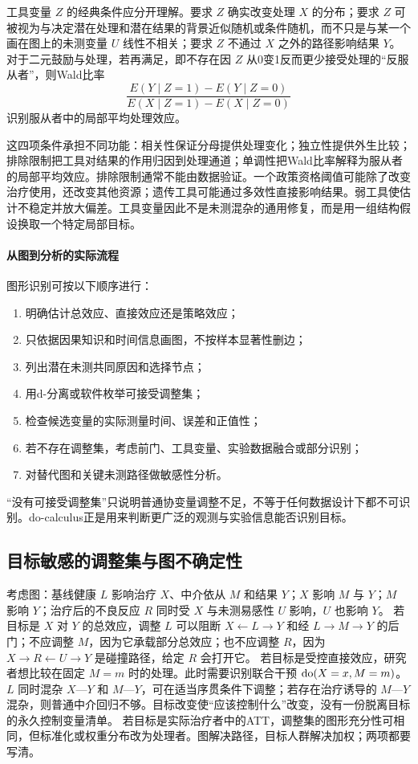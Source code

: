 工具变量 $Z$ 的经典条件应分开理解。要求 $Z$ 确实改变处理 $X$ 的分布；要求 $Z$ 可被视为与决定潜在处理和潜在结果的背景近似随机或条件随机，而不只是与某一个画在图上的未测变量 $U$ 线性不相关；要求 $Z$ 不通过 $X$ 之外的路径影响结果 $Y$。对于二元鼓励与处理，若再满足，即不存在因 $Z$ 从0变1反而更少接受处理的“反服从者”，则Wald比率
\[
\frac{E(Y\mid Z=1)-E(Y\mid Z=0)}
{E(X\mid Z=1)-E(X\mid Z=0)}
\]
识别服从者中的局部平均处理效应\parencite{angrist1996}。

这四项条件承担不同功能：相关性保证分母提供处理变化；独立性提供外生比较；排除限制把工具对结果的作用归因到处理通道；单调性把Wald比率解释为服从者的局部平均效应。排除限制通常不能由数据验证。一个政策资格阈值可能除了改变治疗使用，还改变其他资源；遗传工具可能通过多效性直接影响结果。弱工具使估计不稳定并放大偏差。工具变量因此不是未测混杂的通用修复，而是用一组结构假设换取一个特定局部目标。

\paragraph{从图到分析的实际流程}

图形识别可按以下顺序进行：

\begin{enumerate}
  \item 明确估计总效应、直接效应还是策略效应；
  \item 只依据因果知识和时间信息画图，不按样本显著性删边；
  \item 列出潜在未测共同原因和选择节点；
  \item 用d-分离或软件枚举可接受调整集；
  \item 检查候选变量的实际测量时间、误差和正值性；
  \item 若不存在调整集，考虑前门、工具变量、实验数据融合或部分识别；
  \item 对替代图和关键未测路径做敏感性分析。
\end{enumerate}

“没有可接受调整集”只说明普通协变量调整不足，不等于任何数据设计下都不可识别。do-calculus正是用来判断更广泛的观测与实验信息能否识别目标。

\subsection{目标敏感的调整集与图不确定性}

考虑图：基线健康 $L$ 影响治疗 $X$、中介依从 $M$ 和结果 $Y$；$X$ 影响 $M$ 与 $Y$；$M$ 影响 $Y$；治疗后的不良反应 $R$ 同时受 $X$ 与未测易感性 $U$ 影响，$U$ 也影响 $Y$。
若目标是 $X$ 对 $Y$ 的总效应，调整 $L$ 可以阻断 $X\leftarrow L\rightarrow Y$ 和经 $L\rightarrow M\rightarrow Y$ 的后门；不应调整 $M$，因为它承载部分总效应；也不应调整 $R$，因为 $X\rightarrow R\leftarrow U\rightarrow Y$ 是碰撞路径，给定 $R$ 会打开它。
若目标是受控直接效应，研究者想比较在固定 $M=m$ 时的处理。此时需要识别联合干预 $\operatorname{do}(X=x,M=m)$。$L$ 同时混杂 $X$---$Y$ 和 $M$---$Y$，可在适当序贯条件下调整；若存在治疗诱导的 $M$---$Y$ 混杂，则普通中介回归不够。目标改变使“应该控制什么”改变，没有一份脱离目标的永久控制变量清单。
若目标是实际治疗者中的ATT，调整集的图形充分性可相同，但标准化或权重分布改为处理者。图解决路径，目标人群解决加权；两项都要写清。

